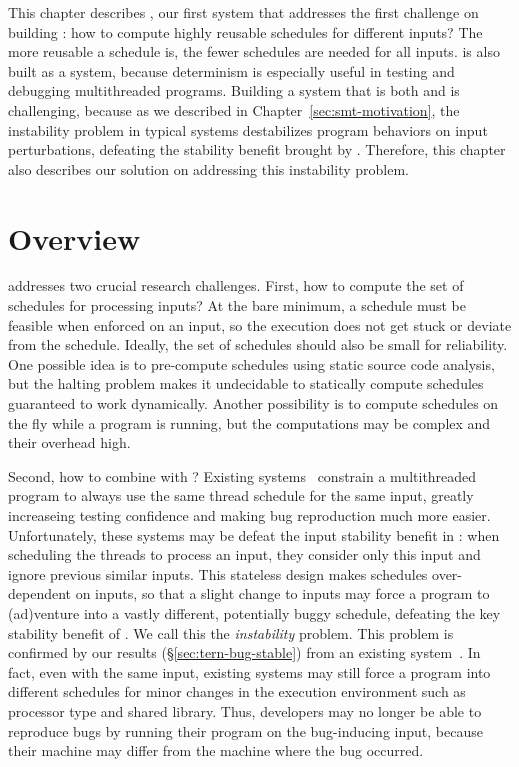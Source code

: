 This chapter describes \tern, our first \smt system that
addresses the first challenge on building \smt: how to compute highly reusable
schedules for different inputs? The more reusable a schedule is, the fewer
schedules are needed for all inputs. \tern is also built as a \dmt system,
because determinism is especially useful in testing and debugging multithreaded
programs. Building a system that is both \smt and \dmt is challenging, because
as we described in Chapter~\ref{sec:smt-motivation}, the instability problem in
typical \dmt systems destabilizes program behaviors on input perturbations,
defeating the stability benefit brought by \smt. Therefore, this chapter
also describes our solution on addressing this instability problem.

\section{Overview} \label{sec:tern-overview}

\tern addresses two crucial research challenges. First, how to compute the set
of schedules for processing inputs?  At the bare minimum, a schedule must be
feasible when enforced on an input, so the execution does not get stuck or
deviate from the schedule.  Ideally, the set of schedules should also be small
for reliability.  One possible idea is to pre-compute schedules using static
source code analysis, but the halting problem makes it undecidable to
statically compute schedules guaranteed to work dynamically.  Another
possibility is to compute schedules on the fly while a program is running,
but the computations may be complex and their overhead high.

Second, how to combine \dmt with \smt? Existing \dmt
systems~\cite{dmp:asplos09,coredet:asplos10,kendo:asplos09} constrain a
multithreaded program to always use the same thread schedule for the same input,
greatly increaseing testing confidence and making bug reproduction much more
easier. Unfortunately, these \dmt systems may be defeat the input stability
benefit in \smt: when scheduling the threads to process an
input, they consider only this input and ignore previous similar inputs.  This
stateless design makes schedules over-dependent on inputs, so that a slight
change to inputs may force a program to (ad)venture into a vastly different,
potentially buggy schedule, defeating the key stability benefit of \smt.  We
call this the \emph{instability} problem. This problem is confirmed by our
results (\S\ref{sec:tern-bug-stable}) from an existing \dmt
system~\cite{coredet:asplos10}. In fact, even with the same input, existing \dmt
systems may still force a program into different schedules for minor changes in
the execution environment such as processor type and shared library.  Thus,
developers may no longer be able to reproduce bugs by running their
program on the bug-inducing input, because their machine may differ from
the machine where the bug occurred.

